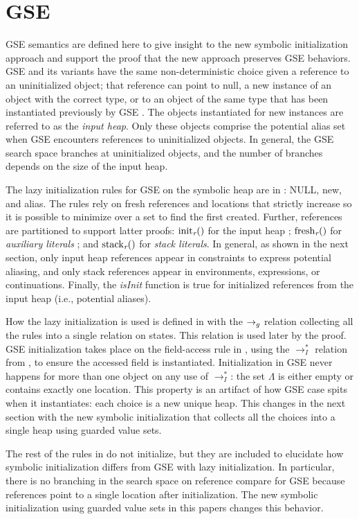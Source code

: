 \section{GSE}
\label{app:gse}
GSE semantics are defined here to give insight to the new symbolic initialization approach and support the proof that the new approach preserves GSE behaviors. GSE and its variants have the same non-deterministic choice given a reference to an uninitialized object; that reference can point to null, a new instance of an object with the correct type, or to an object of the same type that has been instantiated previously by GSE \cite{GSE03,KiasanKunit,Cadar:2008,Rosner:2015}. The objects instantiated for new instances are referred to as the \emph{input heap}. Only these objects comprise the potential alias set when GSE encounters references to uninitialized objects. In general, the GSE search space branches at uninitialized objects, and the number of branches depends on the size of the input heap.

The lazy initialization rules for GSE on the symbolic heap are in
: NULL, new, and alias. The rules rely on fresh references and locations that strictly increase so it is possible to minimize over a set to find the first created. Further, references are partitioned to support latter proofs: $\mathrm{init}_{\emph{r}}()$ for the input
  heap
  ; $\mathrm{fresh}_{\emph{r}}()$ for \emph{auxiliary
  literals}
  ; and $\mathrm{stack}_{\emph{r}}()$ for \emph{stack
    literals}.
  In general, as shown in the next section,
  only input heap references appear in constraints to express potential aliasing, and only stack references appear in environments, expressions, or continuations.  Finally, the \emph{isInit} function is true for initialized references from the input heap (i.e., potential aliases). 

How the lazy
initialization is used is defined in  with the $\rightarrow_{g}$ relation collecting all the rules into a single relation on states. This relation is used later by the proof. GSE initialization takes place on the field-access rule in ,
using the $\rightarrow_I^*$ relation from , to ensure the accessed field is
instantiated. Initialization in GSE never
happens for more than one object on any use of $\rightarrow_I^*$:
the set $\Lambda$ is either empty or contains exactly one location. This property is an artifact of how GSE case spits when it instantiates: each choice is a new unique heap. This changes in the next section with the new symbolic initialization that collects all the choices into a single heap using guarded value sets.

The rest of the rules in  do not initialize, but they are included to elucidate how symbolic initialization differs from GSE with lazy initialization. In particular, there is no branching in the search space on reference compare for GSE because references point to a single location after initialization. The new symbolic initialization using guarded value sets in this papers changes this behavior. 



